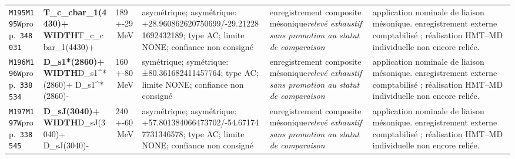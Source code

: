 \begin{landscape}
\begin{longtable}{L{1.85cm}L{4.45cm}L{2.35cm}L{4.05cm}L{3.35cm}L{7.15cm}}
\texttt{M195}\newline \texttt{M195W}\newline prop.\ \texttt{348031} & \textbf{T\_\allowbreak{}c\_\allowbreak{}cbar\_\allowbreak{}1(4430)+ WIDTH}\newline T\_\allowbreak{}c\_\allowbreak{}cbar\_\allowbreak{}1(4430)+ & 189+-29\,MeV & asymétrique; asymétrique: +28.960862620750699/-29.212281692432189; type AC; limite NONE; confiance non consigné & enregistrement composite mésonique\newline \emph{relevé exhaustif sans promotion au statut de comparaison} & application nominale de liaison mésonique. enregistrement externe comptabilisé ; réalisation HMT--MD individuelle non encore reliée. \\
\texttt{M196}\newline \texttt{M196W}\newline prop.\ \texttt{338534} & \textbf{D\_\allowbreak{}s1*(2860)+ WIDTH}\newline D\_\allowbreak{}s1\textasciicircum{}*(2860)+ \textbar{}\allowbreak{} D\_\allowbreak{}s1\textasciicircum{}*(2860)- & 160+-80\,MeV & symétrique; symétrique: ±80.361682411457764; type AC; limite NONE; confiance non consigné & enregistrement composite mésonique\newline \emph{relevé exhaustif sans promotion au statut de comparaison} & application nominale de liaison mésonique. enregistrement externe comptabilisé ; réalisation HMT--MD individuelle non encore reliée. \\
\texttt{M197}\newline \texttt{M197W}\newline prop.\ \texttt{338545} & \textbf{D\_\allowbreak{}sJ(3040)+ WIDTH}\newline D\_\allowbreak{}sJ(3040)+ \textbar{}\allowbreak{} D\_\allowbreak{}sJ(3040)- & 240+-60\,MeV & asymétrique; asymétrique: +57.801384066473702/-54.671747731346578; type AC; limite NONE; confiance non consigné & enregistrement composite mésonique\newline \emph{relevé exhaustif sans promotion au statut de comparaison} & application nominale de liaison mésonique. enregistrement externe comptabilisé ; réalisation HMT--MD individuelle non encore reliée. \\

\end{longtable}
\end{landscape}
